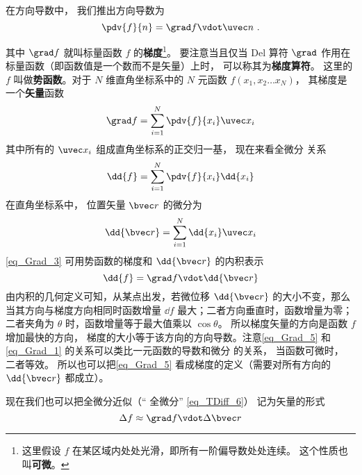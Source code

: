

在方向导数中， 我们推出方向导数为
\begin{equation}\label{eq_Grad_1}
\pdv{f}{n} = \grad f \vdot \uvec n~.
\end{equation}

其中 $\grad f$ 就叫标量函数 $f$ 的\textbf{梯度}\footnote{这里假设 $f$ 在某区域内处处光滑，即所有一阶偏导数处处连续。 这个性质也叫\textbf{可微}。}。 要注意当且仅当 Del 算符 $\grad$ 作用在标量函数（即函数值是一个数而不是矢量）上时， 可以称其为\textbf{梯度算符}。 这里的 $f$ 叫做\textbf{势函数}。对于 $N$ 维直角坐标系中的 $N$ 元函数 $f(x_1,x_2\dots x_N)$， 其梯度是一个\textbf{矢量}函数
\begin{equation}
\grad f = \sum_{i=1}^{N}\pdv{f}{x_i}\uvec x_i
\end{equation}
其中所有的 $\uvec x_i$ 组成直角坐标系的正交归一基， 现在来看全微分 关系
\begin{equation}\label{eq_Grad_3}
\dd{f} = \sum_{i = 1}^N \pdv{f}{x_i} \dd{x_i}
\end{equation}
在直角坐标系中， 位置矢量 $\bvec r$ 的微分为
\begin{equation}
\dd{\bvec r} = \sum_{i=1}^{N} \dd{x_i} \uvec x_i
\end{equation}
\autoref{eq_Grad_3} 可用势函数的梯度和 $\dd{\bvec r}$ 的内积表示
\begin{equation}\label{eq_Grad_5}
\dd{f} = \grad f \vdot \dd{\bvec r}
\end{equation}
由内积的几何定义可知，从某点出发，若微位移 $\dd{\bvec r}$ 的大小不变，那么当其方向与梯度方向相同时函数增量 $\dd{f}$ 最大；二者方向垂直时，函数增量为零；二者夹角为 $\theta$ 时，函数增量等于最大值乘以 $\cos \theta$。 所以梯度矢量的方向是函数 $f$ 增加最快的方向， 梯度的大小等于该方向的方向导数。注意\autoref{eq_Grad_5} 和\autoref{eq_Grad_1} 的关系可以类比一元函数的导数和微分 的关系， 当函数可微时， 二者等效。 所以也可以把\autoref{eq_Grad_5} 看成梯度的定义（需要对所有方向的 $\dd{\bvec r}$ 都成立）。

现在我们也可以把全微分近似（“ 全微分” \autoref{eq_TDiff_6}） 记为矢量的形式
\begin{equation}\label{eq_Grad_6}
\Delta f \approx \grad f \vdot \Delta \bvec r
\end{equation}

